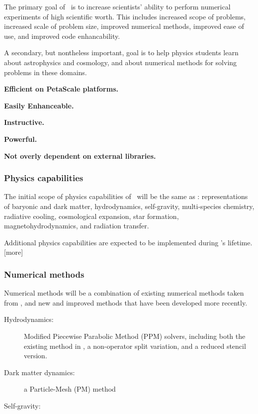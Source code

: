\documentclass{article}
\begin{document}
    The primary goal of \cello\ is to increase scientists' ability to
    perform numerical experiments of high scientific worth.  This
    includes increased scope of problems, increased scale of problem
    size, improved numerical methods, improved ease of use, and
    improved code enhancability.

    A secondary, but nontheless important, goal is to help
    physics students learn about astrophysics and cosmology, and
    about numerical methods for solving problems in these
    domains.

    \textbf{Efficient on PetaScale platforms.}

    \textbf{Easily Enhanceable.}

    \textbf{Instructive.}  

    \textbf{Powerful.}

    \textbf{Not overly dependent on external libraries.}

    \subsubsection{Physics capabilities}

    The initial scope of physics capabilities of \cello\ will be the
    same as \enzo: representations of baryonic and dark matter,
    hydrodynamics, self-gravity, multi-species chemistry, radiative
    cooling, cosmological expansion, star formation,
    magnetohydrodynamics, and radiation transfer.

    Additional physics capabilities are expected to be implemented
    during \cello's lifetime.  [more]

    \subsubsection{Numerical methods}

    Numerical methods will be a combination of existing numerical
    methods taken from \enzo, and new and improved methods that
    have been developed more recently.

    \begin{description}
% 
    \item[Hydrodynamics: ] Modified Piecewise Parabolic Method (PPM)
    solvers, including both the existing method in \enzo, a
    non-operator split variation, and a reduced stencil version.
%
    \item[Dark matter dynamics: ] a Particle-Mesh (PM) method
%
    \item[Self-gravity: ]  
    \end{description}
\end{document}
